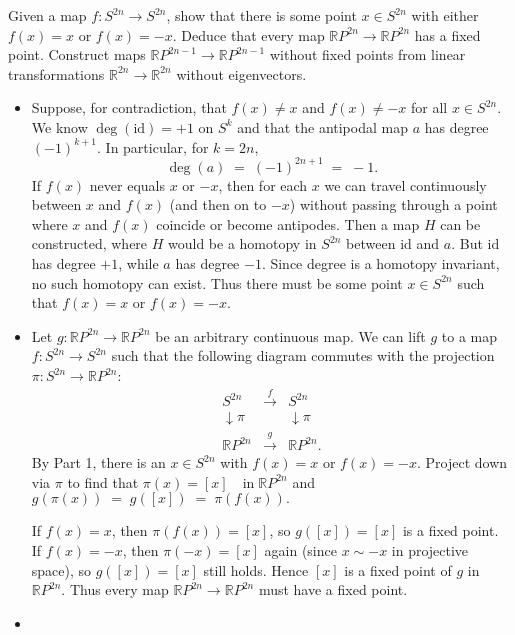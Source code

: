 \documentclass[12pt]{article}
\begin{document}
\begin{statement}[3]
  Given a map $f: S^{2n} \to S^{2n}$, show that there is some point $x \in S^{2n}$ with either $f(x)=x$ or $f(x)=-x$. Deduce that 
  every map $\mathbb{R}P^{2n} \to \mathbb{R}P^{2n}$ has a fixed point. Construct maps $\mathbb{R}P^{2n-1} \to \mathbb{R}P^{2n-1}$
  without fixed points from linear transformations $\mathbb{R}^{2n} \to \mathbb{R}^{2n}$ without eigenvectors. 
\end{statement}
\begin{newproof}
    \begin{itemize}
        \item Suppose, for contradiction, that $f(x) \neq x$ and $f(x) \neq -x$ for all $x \in S^{2n}$. We know $\deg(\mathrm{id}) = +1$ on $S^{k}$ and that the antipodal map $a$ has degree $(-1)^{k+1}$. In particular, for $k = 2n$, 
          $$ \deg(a) \;=\; (-1)^{2n+1} \;=\; -1. $$ If $f(x)$ never equals $x$ or $-x$, then for each $x$ we can travel continuously between $x$ and $f(x)$ (and then on to $-x$) without passing through a point where $x$ and $f(x)$ coincide or become antipodes. Then a map $H$ can be constructed, where $H$ would be a homotopy in $S^{2n}$ between $\mathrm{id}$ and $a$. But $\mathrm{id}$ has degree $+1$, while $a$ has degree $-1$. Since degree is a homotopy invariant, no such homotopy can exist. Thus there must be some point $x \in S^{2n}$ such that $f(x)=x$ or $f(x)=-x$.
          \item Let $g: \mathbb{R}P^{2n} \to \mathbb{R}P^{2n}$ be an arbitrary continuous map. We can lift $g$ to a map $f: S^{2n} \to S^{2n}$ such that the following diagram commutes with the projection $\pi: S^{2n} \to \mathbb{R}P^{2n}$:
            $$ \begin{array}{ccc}
          S^{2n} & \xrightarrow{f} & S^{2n} \\
          \downarrow{\pi} & & \downarrow{\pi} \\
          \mathbb{R}P^{2n} & \xrightarrow{g} & \mathbb{R}P^{2n}.
        \end{array} $$
        By Part 1, there is an $x \in S^{2n}$ with $f(x) = x$ or $f(x) = -x$. Project down via $\pi$ to find that $\pi(x) = [x] \quad\text{in}\; \mathbb{R}P^{2n}$ and $g(\pi(x)) \;=\; g([x]) \;=\; \pi(f(x)).$
        \par If $f(x) = x$, then $\pi(f(x)) = [x]$, so $g([x]) = [x]$ is a fixed point. If $f(x) = -x$, then $\pi(-x) = [x]$ again (since $x \sim -x$ in projective space), so $g([x]) = [x]$ still holds. Hence $[x]$ is a fixed point of $g$ in $\mathbb{R}P^{2n}$. Thus every map $\mathbb{R}P^{2n} \to \mathbb{R}P^{2n}$ must have a fixed point.
        \item 
    \end{itemize}
\end{newproof}
\end{document}
